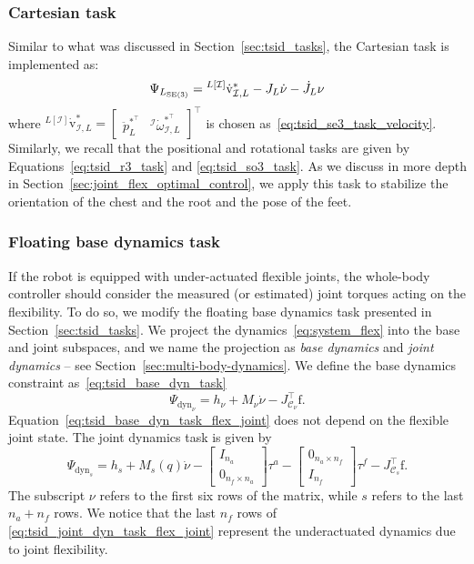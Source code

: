 \subsubsection{Cartesian task}
Similar to what was discussed in Section~\ref{sec:tsid_tasks}, the Cartesian task is implemented as:
\begin{equation}
\label{eq:tsid_se3_task_flex_joint}
    \Psi_{L_{{\mathrm{SE}}(3)}} =  {}^{L[\mathcal{I}]}\dot{\mathrm{v}}_{\mathcal{I},L}^* - J_{L} \dot{\nu} - \dot{J}_{L} {\nu}
\end{equation}
where $ {}^{L[\mathcal{I}]}\dot{\mathrm{v}}^*_{\mathcal{I},L} =\begin{bmatrix}
\ddot{p}_L^{*^\top} & {}^\mathcal{I}\dot{\omega}^{*^\top}_{\mathcal{I},L}
\end{bmatrix} ^\top $ is chosen as~\eqref{eq:tsid_se3_task_velocity}.
Similarly, we recall that the positional and rotational tasks are given by
Equations~\eqref{eq:tsid_r3_task} and \eqref{eq:tsid_so3_task}.
As we discuss in more depth in Section~\ref{sec:joint_flex_optimal_control}, we apply this task
to stabilize the orientation of the chest and the root and the pose of the feet.

\subsubsection{Floating base dynamics task}
If the robot is equipped with under-actuated flexible joints, the whole-body controller should consider the measured (or estimated) joint torques acting on the flexibility. To do so, we modify the floating base dynamics task presented in Section~\ref{sec:tsid_tasks}. 
We project the dynamics~\eqref{eq:system_flex} into the base and joint subspaces, and we name the projection as \emph{base dynamics} and \emph{joint dynamics} -- see Section~\ref{sec:multi-body-dynamics}. We define the base dynamics constraint as~\eqref{eq:tsid_base_dyn_task}
\begin{equation}
    \label{eq:tsid_base_dyn_task_flex_joint}
    \Psi_{\text{dyn}_\nu} =  h_{\nu} +  M_{\nu}\dot{\nu} - J_{\mathcal{C}_\nu}^\top \mathrm{f}.
\end{equation}
Equation~\eqref{eq:tsid_base_dyn_task_flex_joint} does not depend on the flexible joint state.
The joint dynamics task is given by
\begin{equation}
    \label{eq:tsid_joint_dyn_task_flex_joint}
    \Psi_{\text{dyn}_s} =  h_{s} +  M_{s}(q) \dot{\nu} - \begin{bmatrix}
    I_{n_a} \\
    0_{n_f \times n_a}
    \end{bmatrix}
    \tau^a -
    \begin{bmatrix}
    0_{n_a \times n_f} \\
    I_{n_f}
    \end{bmatrix}
    \tau^f - J_{\mathcal{C}_s}^\top \mathrm{f}.
\end{equation}
The subscript $\nu$ refers to the first six rows of the matrix, while $s$ refers to the last $n_a + n_f$ rows. 
We notice that the last $n_f$ rows of \eqref{eq:tsid_joint_dyn_task_flex_joint} represent the underactuated dynamics due to joint flexibility.

